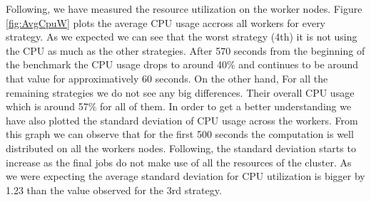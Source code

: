 \documentclass[11pt,a4paper,twoside]{report}
\begin{document}
Following, we have measured the resource utilization on the worker nodes. Figure \ref{fig:AvgCpuW} plots the average CPU usage accross all workers for every strategy. As we expected we can see that the worst strategy (4th) it is not using the CPU as much as the other strategies. After 570 seconds from the beginning of the benchmark the CPU usage drops to around 40\% and continues to be around that value for approximatively 60 seconds. On the other hand, For all the remaining strategies we do not see any big differences. Their overall CPU usage which is around 57\% for all of them. In order to get a better understanding we have also plotted the standard deviation of CPU usage across the workers. From this graph we can observe that for the first 500 seconds the computation is well distributed on all the workers nodes. Following, the standard deviation starts to increase as the final jobs do not make use of all the resources of the cluster. As we were expecting the average standard deviation for CPU utilization is bigger by 1.23 than the value observed for the 3rd strategy.
\end{document}
